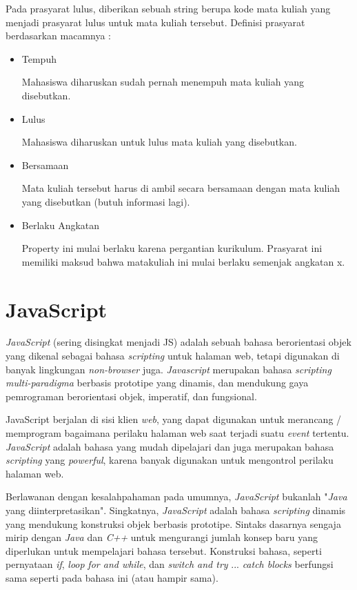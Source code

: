 Pada prasyarat lulus, diberikan sebuah string berupa kode mata kuliah yang menjadi prasyarat lulus untuk mata kuliah tersebut.
Definisi prasyarat berdasarkan macamnya :

\begin{itemize}
    \item Tempuh
    
    Mahasiswa diharuskan sudah pernah menempuh mata kuliah yang disebutkan.
    \item Lulus
    
    Mahasiswa diharuskan untuk lulus mata kuliah yang disebutkan.
    \item Bersamaan
    
    Mata kuliah tersebut harus di ambil secara bersamaan dengan mata kuliah yang disebutkan (butuh informasi lagi).
    \item Berlaku Angkatan
    
    Property ini mulai berlaku karena pergantian kurikulum. Prasyarat ini memiliki maksud bahwa matakuliah ini mulai berlaku semenjak angkatan x.
\end{itemize}

\section{JavaScript}
\textit{JavaScript} (sering disingkat menjadi JS) adalah sebuah bahasa berorientasi objek yang dikenal sebagai bahasa \textit{scripting} untuk halaman web, tetapi digunakan di banyak lingkungan \textit{non-browser} juga. \textit{Javascript} merupakan bahasa \textit{scripting multi-paradigma} berbasis prototipe yang dinamis, dan mendukung gaya pemrograman berorientasi objek, imperatif, dan fungsional. \cite{JavaScript}

JavaScript berjalan di sisi klien \textit{web}, yang dapat digunakan untuk merancang / memprogram bagaimana perilaku halaman web saat terjadi suatu \textit{event} tertentu. \textit{JavaScript} adalah bahasa yang mudah dipelajari dan juga merupakan bahasa \textit{scripting} yang \textit{powerful}, karena banyak digunakan untuk mengontrol perilaku halaman web.

Berlawanan dengan kesalahpahaman pada umumnya, \textit{JavaScript} bukanlah "\textit{Java} yang diinterpretasikan". Singkatnya, \textit{JavaScript} adalah bahasa  \textit{scripting} dinamis yang mendukung konstruksi objek berbasis prototipe. Sintaks dasarnya sengaja mirip dengan \textit{Java} dan \textit{C++} untuk mengurangi jumlah konsep baru yang diperlukan untuk mempelajari bahasa tersebut. Konstruksi bahasa, seperti pernyataan \textit{if}, \textit{loop} \textit{for and while}, dan \textit{switch and try} ... \textit{catch blocks} berfungsi sama seperti pada bahasa ini (atau hampir sama).

